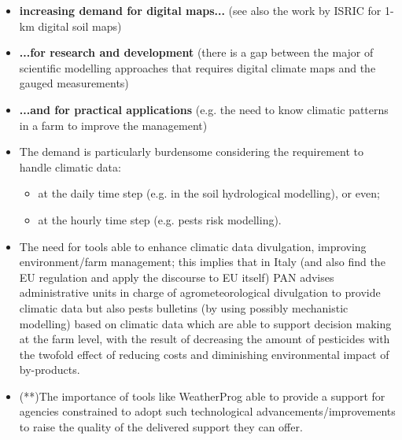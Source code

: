 \documentclass[authoryear,preprint,review,12pt]{elsarticle}
\begin{document}
\begin{itemize}
	\item \textbf{increasing demand for digital maps...} (see also the work by ISRIC for 1-km digital soil maps)\\
	\item \textbf{...for research and development} (there is a gap between the major of scientific modelling approaches that requires digital climate maps and the gauged measurements)\\
	\item \textbf{...and for practical applications} (e.g. the need to know climatic patterns in a farm to improve the management)\\
	\item The demand is particularly burdensome considering the requirement to handle climatic data:
	\begin{itemize}
		\item at the daily time step (e.g. in the soil hydrological modelling), or even;
		\item at the hourly time step (e.g. pests risk modelling).
	\end{itemize}

	\item The need for tools able to enhance climatic data divulgation, improving environment/farm management; this implies that in Italy (and also find the EU regulation and apply the discourse to EU itself) PAN advises administrative units in charge of agrometeorological divulgation to provide climatic data but also pests bulletins (by using possibly mechanistic modelling) based on climatic data which are able to support decision making at the farm level, with the result of decreasing the amount of pesticides with the twofold effect of reducing costs and diminishing environmental impact of by-products.\\

	\item (**)The importance of tools like WeatherProg able to provide a support for agencies constrained to adopt such technological advancements/improvements to raise the quality of the delivered support they can offer.


\end{itemize}
\end{document}
